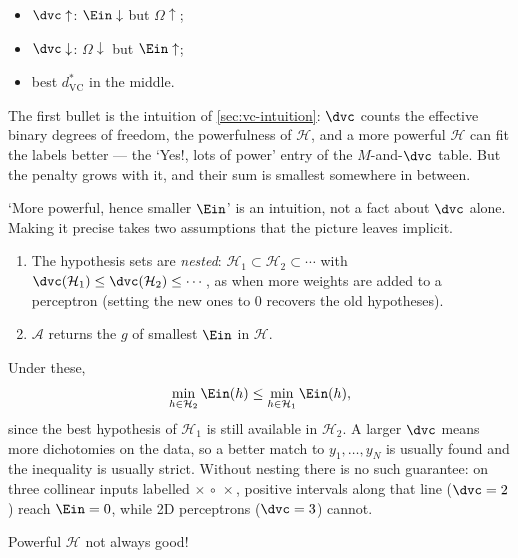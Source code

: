 \begin{itemize}
    \item \(\dvc \uparrow\): \(\Ein \downarrow\) but \(\Omega \uparrow\);
    \item \(\dvc \downarrow\): \(\Omega \downarrow\) but \(\Ein \uparrow\);
    \item best \(d_{\mathrm{VC}}^*\) in the middle.
\end{itemize}

The first bullet is the intuition of \autoref{sec:vc-intuition}: \(\dvc\)
counts the effective binary degrees of freedom, the powerfulness of
\(\mathcal{H}\), and a more powerful \(\mathcal{H}\) can fit the labels
better --- the `Yes!, lots of power' entry of the \(M\)-and-\(\dvc\) table.
But the penalty grows with it, and their sum is smallest somewhere in between.

\begin{remark}
    `More powerful, hence smaller \(\Ein\)' is an intuition, not a fact about
    \(\dvc\) alone. Making it precise takes two assumptions that the picture
    leaves implicit.
    \begin{enumerate}
        \item The hypothesis sets are \emph{nested}: \(\mathcal{H}_1 \subset
            \mathcal{H}_2 \subset \cdots\) with \(\dvc(\mathcal{H}_1) \le
            \dvc(\mathcal{H}_2) \le \cdots\), as when more weights are added to
            a perceptron (setting the new ones to \(0\) recovers the old
            hypotheses).
        \item \(\mathcal{A}\) returns the \(g\) of smallest \(\Ein\) in
            \(\mathcal{H}\).
    \end{enumerate}
    Under these,
    \[
        \min_{h \in \mathcal{H}_2} \Ein(h) \le \min_{h \in \mathcal{H}_1}
        \Ein(h) ,
    \]
    since the best hypothesis of \(\mathcal{H}_1\) is still available in
    \(\mathcal{H}_2\). A larger \(\dvc\) means more dichotomies on the data,
    so a better match to \(y_1, \dots , y_N\) is usually found and the
    inequality is usually strict. Without nesting there is no such guarantee:
    on three collinear inputs labelled \(\times\,\circ\,\times\), positive
    intervals along that line (\(\dvc = 2\)) reach \(\Ein = 0\), while 2D
    perceptrons (\(\dvc = 3\)) cannot.
\end{remark}

\begin{moral}
    Powerful \(\mathcal{H}\) not always good!
\end{moral}

